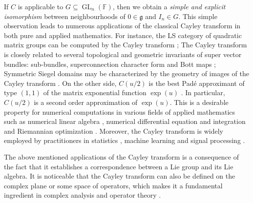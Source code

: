 \documentclass[11pt,reqno]{amsart}
\DeclareMathOperator{\GL}{GL}
\begin{document}
If $C$ is applicable to $G \subseteq \GL_n(\mathbb{F})$,  then we obtain a \emph{simple and explicit isomorphism} between neighbourhoods of $0 \in \mathfrak{g}$ and $I_n \in G$.  This simple observation leads to numerous applications of the classical Cayley transform in both pure and applied mathematics.  For instance,  the LS category of quadratic matrix groups can be computed by the Cayley transform \cite{GMP11}; The Cayley transform is closely related to several topological and geometric invariants of super vector bundles: sub-bundles,  superconnection character form and Bott maps \cite{Quillen85, Quillen88}; Symmetric Siegel domains may be characterized by the geometry of images of the Cayley transform \cite{Nomura01,  Nomura03, Kai07}.  On the other side,  $C(u/2)$ is the best Pad\'{e} approximant of type $(1,1)$ of the matrix exponential function $\exp(u)$ \cite{BG96}.  In particular,  $C(u/2)$ is a second order approximation of $\exp(u)$.  This is a desirable property for numerical computations in various fields of applied mathematics such as numerical linear algebra \cite{MR96,BCM04, MST24},  numerical differential equation and integration \cite{Iserles01,PX01,HLW10, WGM21} and Riemannian optimization \cite{WY13, GSAS21}.  Moreover,  the Cayley transform is widely employed by practitioners in statistics \cite{JHD20},  machine learning \cite{HWY18,  ESAH20} and signal processing \cite{JH03, MD24}. 

The above mentioned applications of the Cayley transform is a consequence of the fact that it establishes a correspondence between a Lie group and its Lie algebra.  It is noticeable that the Cayley transform can also be defined on the complex plane or some space of operators,  which makes it a fundamental ingredient in complex analysis \cite{Krantz99,ST20,vWW24} and operator theory \cite{SF70,  Lance95, JM17,BKR20}. 
\end{document}
